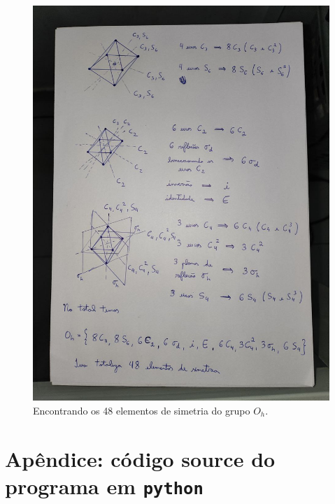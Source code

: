 \documentclass[a4paper,10pt]{article}
\newcommand{\python}[1]{\texttt{#1}}
\begin{document}
\begin{figure}[H]
\centering
\includegraphics[width=\linewidth]{fig/48-elementos-simetria.jpg}
\caption{Encontrando os 48 elementos de simetria do grupo $O_h$.}
\label{fig:48-elementos-simetria}
\end{figure}

\pagebreak

\section*{Apêndice: código source do programa em \python{python}} \label{sec:apendice}
\end{document}
